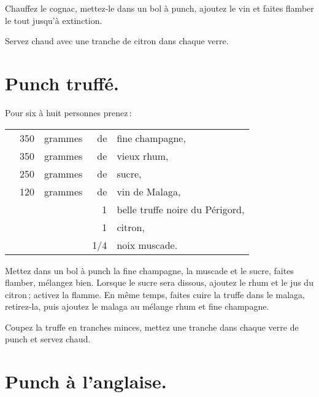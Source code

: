 Chauffez le cognac, mettez-le dans un bol à punch, ajoutez le vin et faites
flamber le tout jusqu'à extinction.

Servez chaud avec une tranche de citron dans chaque verre.

\section*{\centering Punch truffé.}
{}

Pour six à huit personnes prenez :

\footnotesize
\begin{longtable}{rrrrp{16em}}
  & 350 & grammes &  de & fine champagne,                                                                 \\
  & 350 & grammes &  de & vieux rhum,                                                                     \\
  & 250 & grammes &  de & sucre,                                                                          \\
  & 120 & grammes &  de & vin de Malaga,                                                                  \\
  &     &         &   1 & belle truffe noire du Périgord,                                                 \\
  &     &         &   1 & citron,                                                                         \\
  &     &         & 1/4 & noix muscade.                                                                   \\
\end{longtable}
\normalsize

Mettez dans un bol à punch la fine champagne, la muscade et le sucre, faites
flamber, mélangez bien. Lorsque le sucre sera dissous, ajoutez le rhum et le
jus du citron ; activez la flamme. En même temps, faites cuire la truffe dans
le malaga, retirez-la, puis ajoutez le malaga au mélange rhum et fine
champagne.

Coupez la truffe en tranches minces, mettez une tranche dans chaque verre de
punch et servez chaud.

\section*{\centering Punch à l'anglaise.}
{}

